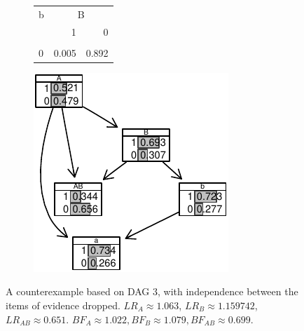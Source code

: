 \documentclass[
  10pt,
  dvipsnames,enabledeprecatedfontcommands]{scrartcl}
\begin{document}
\begin{figure}
\begin{subfigure}[ht!]{0.45\textwidth}
\begin{tabular}{lrr}
\toprule
\multicolumn{1}{c}{b} & \multicolumn{2}{c}{B} \\
  & 1 & 0\\
\midrule
\cellcolor{gray!6}{1} & \cellcolor{gray!6}{0.995} & \cellcolor{gray!6}{0.108}\\
0 & 0.005 & 0.892\\
\bottomrule
\end{tabular}

\normalsize 


\end{subfigure} 
\hspace{5mm}\begin{subfigure}{0.45\textwidth}

\begin{center}\includegraphics[width=1\linewidth]{conjunction-appendix14_files/figure-latex/unnamed-chunk-29-1} \end{center}
\end{subfigure} 
\caption{A counterexample based on \textsf{DAG 3}, with independence between the items of evidence dropped.   $LR_A  \approx 1.063$, $LR_B \approx 1.159742$,  $LR_{AB} \approx 0.651$. $BF_A \approx  1.022, BF_B \approx  1.079, BF_{AB}\approx   0.699$.}
\label{fig:CPTDoubleL}
\end{figure}
\end{document}
